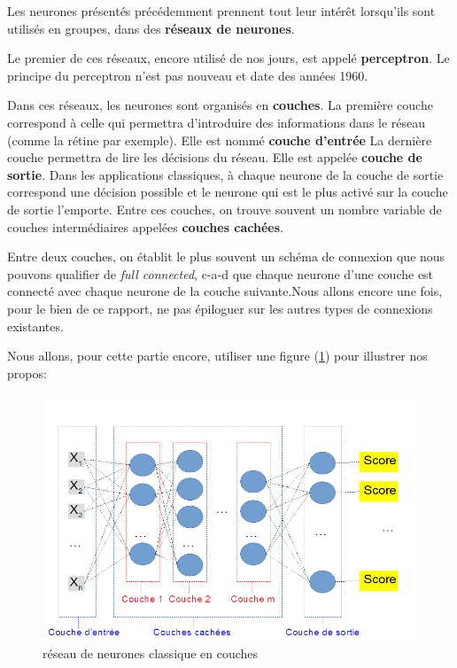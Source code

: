 Les neurones présentés précédemment prennent tout leur intérêt lorsqu'ils sont utilisés en groupes, dans des \textbf{réseaux de neurones}.

Le premier de ces réseaux, encore utilisé de nos jours, est appelé \textbf{perceptron}.
Le principe du perceptron n'est pas nouveau et date des années 1960.

Dans ces réseaux, les neurones sont organisés en \textbf{couches}.
La première couche correspond à celle qui permettra d'introduire des informations dans le réseau (comme la rétine par exemple). Elle est nommé \textbf{couche d'entrée}
La dernière couche permettra de lire les décisions du réseau. Elle est appelée \textbf{couche de sortie}. Dans les applications classiques, à chaque neurone de la couche de sortie correspond une décision possible et le neurone qui est le plus activé sur la couche de sortie l'emporte.
Entre ces couches, on trouve souvent un nombre variable de couches intermédiaires appelées \textbf{couches cachées}.

Entre deux couches, on établit le plus souvent un schéma de connexion que nous pouvons qualifier de \textit{full connected}, c-a-d que chaque neurone d'une couche est connecté avec chaque neurone de la couche suivante.Nous allons encore une fois, pour le bien de ce rapport, ne pas épiloguer sur les autres types de connexions existantes.\newline

Nous allons, pour cette partie encore, utiliser une figure (\ref{reseauClassique}) pour illustrer nos propos:

\begin{figure}[h]
\includegraphics[width=16.5cm]{./images/multicouche.png}
\caption{réseau de neurones classique en couches}
\label{reseauClassique}
\end{figure}

